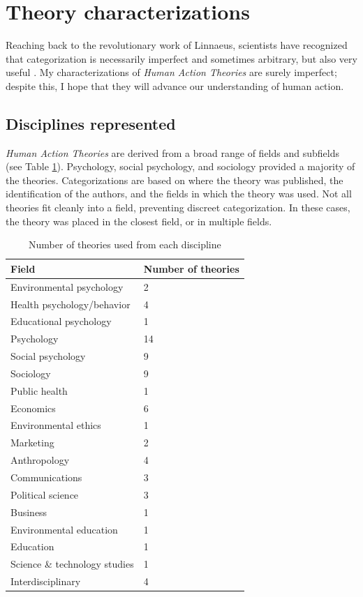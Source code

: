 \documentclass[12 pt]{article}
\begin{document}
\section{Theory characterizations}
 Reaching back to the revolutionary work of Linnaeus, scientists have recognized that categorization is necessarily imperfect and sometimes arbitrary, but also very useful  \parencite{Dear2006}. My characterizations of \textit{Human Action Theories} are surely imperfect; despite this, I hope that they will advance our understanding of human action. 
\subsection{Disciplines represented}
\textit{Human Action Theories} are derived from a broad range of fields and subfields (see Table \ref{tab:fields}). Psychology, social psychology, and sociology provided a majority of the theories. Categorizations are based on where the theory was published, the identification of the authors, and the fields in which the theory was used. Not all theories fit cleanly into a field, preventing discreet  categorization. In these cases, the theory was placed in the closest field, or in multiple fields. 

\begin{center}
	\begin{table}
		\centering
		\caption {Number of theories used from each discipline} \label{tab:fields}  
		\begin{tabular}{|l | l|}
			\hline 
			\textbf{Field} & \textbf{Number of theories} \\
			\hline
			Environmental psychology & 2\\
			Health psychology/behavior & 4\\
			Educational psychology & 1 \\
			Psychology & 14 \\
			Social psychology & 9 \\
			Sociology & 9  \\	  
			Public health & 1 \\ 
			Economics & 6 \\
			Environmental ethics & 1 \\
			Marketing & 2 \\
			Anthropology & 4 \\
			Communications & 3 \\
			Political science & 3 \\
			Business & 1 \\
			Environmental education & 1 \\ 
			Education & 1 \\
			Science \& technology studies & 1 \\ 
			Interdisciplinary & 4 \\
			\hline
			\hline
		\end{tabular}
	\end{table}
\end{center}
\end{document}
